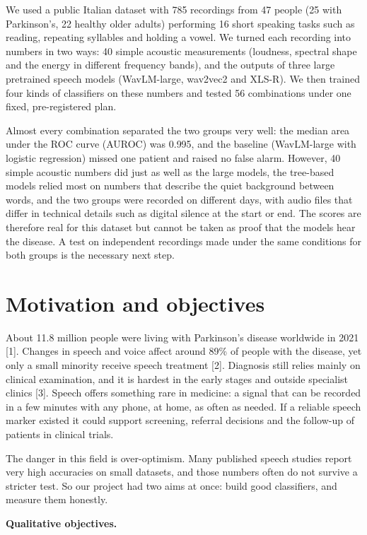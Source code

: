 \documentclass[11pt,a4paper]{article}
\begin{document}
We used a public Italian dataset with 785 recordings from 47 people (25 with Parkinson's, 22 healthy older adults) performing 16 short speaking tasks such as reading, repeating syllables and holding a vowel. We turned each recording into numbers in two ways: 40 simple acoustic measurements (loudness, spectral shape and the energy in different frequency bands), and the outputs of three large pretrained speech models (WavLM-large, wav2vec2 and XLS-R). We then trained four kinds of classifiers on these numbers and tested 56 combinations under one fixed, pre-registered plan.

Almost every combination separated the two groups very well: the median area under the ROC curve (AUROC) was 0.995, and the baseline (WavLM-large with logistic regression) missed one patient and raised no false alarm. However, 40 simple acoustic numbers did just as well as the large models, the tree-based models relied most on numbers that describe the quiet background between words, and the two groups were recorded on different days, with audio files that differ in technical details such as digital silence at the start or end. The scores are therefore real for this dataset but cannot be taken as proof that the models hear the disease. A test on independent recordings made under the same conditions for both groups is the necessary next step.

\section{Motivation and objectives}\label{sec:motivation}
About 11.8 million people were living with Parkinson's disease worldwide in 2021 [1]. Changes in speech and voice affect around 89\% of people with the disease, yet only a small minority receive speech treatment [2]. Diagnosis still relies mainly on clinical examination, and it is hardest in the early stages and outside specialist clinics [3]. Speech offers something rare in medicine: a signal that can be recorded in a few minutes with any phone, at home, as often as needed. If a reliable speech marker existed it could support screening, referral decisions and the follow-up of patients in clinical trials.

The danger in this field is over-optimism. Many published speech studies report very high accuracies on small datasets, and those numbers often do not survive a stricter test. So our project had two aims at once: build good classifiers, and measure them honestly.

\textbf{Qualitative objectives.}
\end{document}
